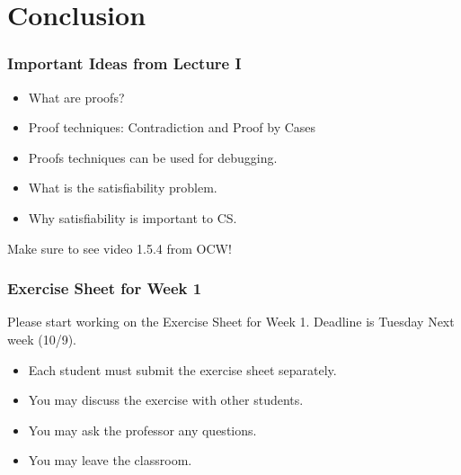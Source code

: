 \documentclass{beamer}
\begin{document}
\section{Conclusion}
\begin{frame}
  \frametitle{Important Ideas from Lecture I}
  \begin{itemize}
  \item What are proofs?
  \item Proof techniques: Contradiction and Proof by Cases
  \item Proofs techniques can be used for debugging.
  \item What is the satisfiability problem.
  \item Why satisfiability is important to CS.
  \end{itemize}

  \bigskip

  Make sure to see video 1.5.4 from OCW!
\end{frame}

\begin{frame}
  \frametitle{Exercise Sheet for Week 1}

  Please start working on the Exercise Sheet for Week 1. Deadline is
  Tuesday Next week (10/9).

  \vfill

  \begin{itemize}
  \item Each student must submit the exercise sheet separately.
  \item You may discuss the exercise with other students.
  \item You may ask the professor any questions.
  \item You may leave the classroom.
  \end{itemize}

\end{frame}
\end{document}
